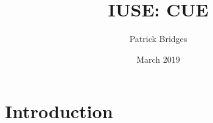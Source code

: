 \documentclass{article}
\title{IUSE: CUE}
\author{Patrick Bridges}
\date{March 2019}
\begin{document}
\maketitle

\section{Introduction}
\end{document}
